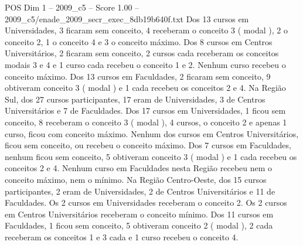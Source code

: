 \begin{textsample}{POS Dim 1 – 2009\_c5 – Score 1.00 – 2009\_c5/enade\_2009\_secr\_exec\_8db19b640f.txt}
Dos 13 cursos em Universidades, 3 ficaram sem conceito, 4 receberam o conceito 3 ( modal ), 2 o conceito 2, 1 o conceito 4 e 3 o conceito máximo.
Dos 8 cursos em Centros Universitários, 2 ficaram sem conceito, 2 cursos cada receberam os conceitos modais 3 e 4 e 1 curso cada recebeu o conceito 1 e 2.
Nenhum curso recebeu o conceito máximo.
Dos 13 cursos em Faculdades, 2 ficaram sem conceito, 9 obtiveram conceito 3 ( modal ) e 1 cada recebeu os conceitos 2 e 4.
Na Região Sul, dos 27 cursos participantes, 17 eram de Universidades, 3 de Centros Universitários e 7 de Faculdades.
Dos 17 cursos em Universidades, 1 ficou sem conceito, 8 receberam o conceito 3 ( modal ), 4 cursos, o conceito 2 e apenas 1 curso, ficou com conceito máximo.
Nenhum dos cursos em Centros Universitários, ficou sem conceito, ou recebeu o conceito máximo.
Dos 7 cursos em Faculdades, nenhum ficou sem conceito, 5 obtiveram conceito 3 ( modal ) e 1 cada recebeu os conceitos 2 e 4.
Nenhum curso em Faculdades nesta Região recebeu nem o conceito máximo, nem o mínimo.
Na Região Centro-Oeste, dos 15 cursos participantes, 2 eram de Universidades, 2 de Centros Universitários e 11 de Faculdades.
Os 2 cursos em Universidades receberam o conceito 2.
Os 2 cursos em Centros Universitários receberam o conceito mínimo.
Dos 11 cursos em Faculdades, 1 ficou sem conceito, 5 obtiveram conceito 2 ( modal ), 2 cada receberam os conceitos 1 e 3 cada e 1 curso recebeu o conceito 4.

\end{textsample}
